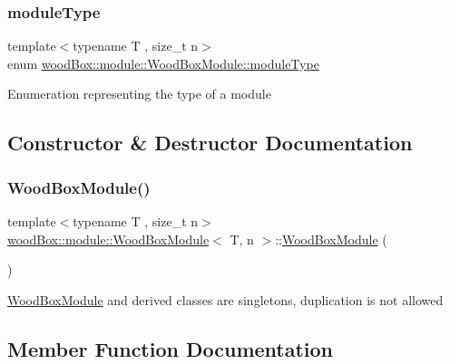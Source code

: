 \subsubsection{\texorpdfstring{module\+Type}{moduleType}}
{\footnotesize\ttfamily template$<$typename T , size\+\_\+t n$>$ \\
enum \mbox{\hyperlink{classwood_box_1_1module_1_1_wood_box_module_af74476c8a785de7fe587c4fb68435673}{wood\+Box\+::module\+::\+Wood\+Box\+Module\+::module\+Type}}}

Enumeration representing the type of a module 

\subsection{Constructor \& Destructor Documentation}
\mbox{\label{classwood_box_1_1module_1_1_wood_box_module_ade3d82ff1e508da2ad37185c208f9333}} 
\subsubsection{\texorpdfstring{Wood\+Box\+Module()}{WoodBoxModule()}}
{\footnotesize\ttfamily template$<$typename T , size\+\_\+t n$>$ \\
\mbox{\hyperlink{classwood_box_1_1module_1_1_wood_box_module}{wood\+Box\+::module\+::\+Wood\+Box\+Module}}$<$ T, n $>$\+::\mbox{\hyperlink{classwood_box_1_1module_1_1_wood_box_module}{Wood\+Box\+Module}} (\begin{DoxyParamCaption}\item[{const \mbox{\hyperlink{classwood_box_1_1module_1_1_wood_box_module}{Wood\+Box\+Module}}$<$ T, n $>$ \&}]{ }\end{DoxyParamCaption})\hspace{0.3cm}{\ttfamily [delete]}}

\mbox{\hyperlink{classwood_box_1_1module_1_1_wood_box_module}{Wood\+Box\+Module}} and derived classes are singletons, duplication is not allowed 

\subsection{Member Function Documentation}
\mbox{\label{classwood_box_1_1module_1_1_wood_box_module_ac481cbb3ee83f192218a5943c59d74fe}} 
